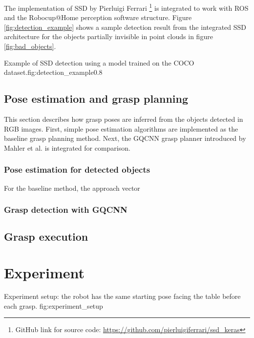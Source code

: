 The implementation of SSD by Pierluigi Ferrari \footnote{GitHub link for source code: 
    \url{https://github.com/pierluigiferrari/ssd_keras}} is integrated to work with ROS and the Robocup@Home perception
software structure. 
Figure \ref{fig:detection_example} shows a sample detection result from the integrated SSD architecture for the objects
partially invisible in point clouds in figure \ref{fig:bad_objects}.

             {Example of SSD detection using a model trained on the COCO dataset.}{fig:detection_example}{0.8\textwidth}

\subsection{Pose estimation and grasp planning}

This section describes how grasp poses are inferred from the objects detected in RGB images. First, simple pose
estimation algorithms are implemented as the baseline grasp planning method. Next, the GQCNN grasp planner introduced
by Mahler et al. \cite{mahler2017} is integrated for comparison.

\subsubsection*{Pose estimation for detected objects}
For the baseline method, the approach vector

\subsubsection*{Grasp detection with GQCNN}

\subsection{Grasp execution}

\pagebreak
\section{Experiment}


             {Experiment setup: the robot has the same starting pose facing the table before each grasp.}
             {fig:experiment_setup}{\textwidth}

